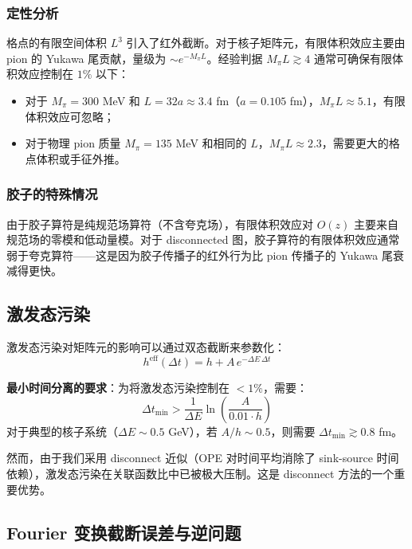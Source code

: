 \documentclass[11pt,a4paper]{ctexart}
\begin{document}
\subsubsection{定性分析}

格点的有限空间体积 $L^3$ 引入了红外截断。对于核子矩阵元，有限体积效应主要由 pion 的 Yukawa 尾贡献，量级为 $\sim e^{-M_\pi L}$。经验判据 $M_\pi L \gtrsim 4$ 通常可确保有限体积效应控制在 $1\%$ 以下：
\begin{itemize}
  \item 对于 $M_\pi = 300$ MeV 和 $L=32a \approx 3.4$ fm（$a=0.105$ fm），$M_\pi L \approx 5.1$，有限体积效应可忽略；
  \item 对于物理 pion 质量 $M_\pi = 135$ MeV 和相同的 $L$，$M_\pi L \approx 2.3$，需要更大的格点体积或手征外推。
\end{itemize}

\subsubsection{胶子的特殊情况}

由于胶子算符是纯规范场算符（不含夸克场），有限体积效应对 $O(z)$ 主要来自规范场的零模和低动量模。对于 disconnected 图，胶子算符的有限体积效应通常弱于夸克算符——这是因为胶子传播子的红外行为比 pion 传播子的 Yukawa 尾衰减得更快。

\subsection{激发态污染}

激发态污染对矩阵元的影响可以通过双态截断来参数化：
\begin{equation}
h^{\text{eff}}(\Delta t) = h + A \, e^{-\Delta E \, \Delta t}
\end{equation}

\textbf{最小时间分离的要求}：为将激发态污染控制在 $<1\%$，需要：
\begin{equation}
\Delta t_{\text{min}} > \frac{1}{\Delta E} \ln\!\left( \frac{A}{0.01 \cdot h} \right)
\end{equation}
对于典型的核子系统（$\Delta E \sim 0.5$ GeV），若 $A/h \sim 0.5$，则需要 $\Delta t_{\text{min}} \gtrsim 0.8$ fm。

然而，由于我们采用 disconnect 近似（OPE 对时间平均消除了 sink-source 时间依赖），激发态污染在关联函数比中已被极大压制。这是 disconnect 方法的一个重要优势。

\subsection{Fourier 变换截断误差与逆问题}
\end{document}
